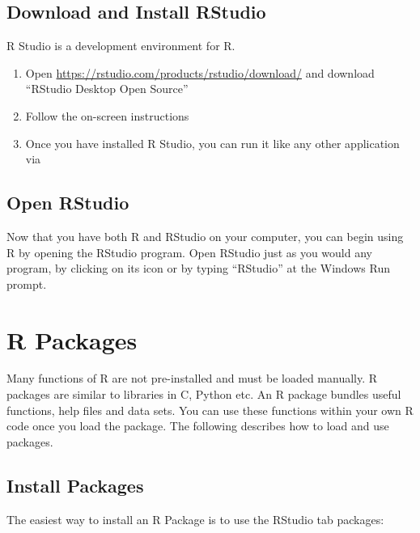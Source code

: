 \documentclass[
]{book}
\providecommand{\tightlist}{%
  \setlength{\itemsep}{0pt}\setlength{\parskip}{0pt}}
\begin{document}
\hypertarget{download-and-install-rstudio}{%
\section{Download and Install RStudio}\label{download-and-install-rstudio}}

R Studio is a development environment for R.

\begin{enumerate}
\def\labelenumi{\arabic{enumi}.}
\tightlist
\item
  Open \url{https://rstudio.com/products/rstudio/download/} and download ``RStudio Desktop Open Source''
\item
  Follow the on-screen instructions
\item
  Once you have installed R Studio, you can run it like any other application via
\end{enumerate}

\hypertarget{open-rstudio}{%
\section{Open RStudio}\label{open-rstudio}}

Now that you have both R and RStudio on your computer, you can begin using R by opening the RStudio program. Open RStudio just as you would any program, by clicking on its icon or by typing ``RStudio'' at the Windows Run prompt.

\hypertarget{packages}{%
\chapter{R Packages}\label{packages}}

Many functions of R are not pre-installed and must be loaded manually. R packages are similar to libraries in C, Python etc. An R package bundles useful functions, help files and data sets. You can use these functions within your own R code once you load the package. The following describes how to load and use packages.

\hypertarget{install-packages}{%
\section{Install Packages}\label{install-packages}}

The easiest way to install an R Package is to use the RStudio tab packages:
\end{document}
